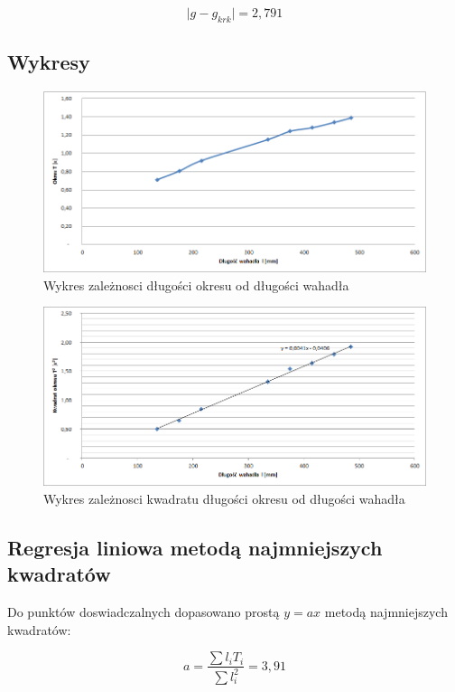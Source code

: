 \documentclass[a4paper,10pt,twoside]{article}
\begin{document}
$$\vert g - g_{krk} \vert = 2,791$$

\newpage

\subsection{Wykresy}

\begin{figure}[!htp]
\centerline{\includegraphics[scale=1]{wykres1.png}}
\caption{Wykres zależnosci długości okresu od długości wahadła}
\label{fig:tl}
\end{figure}

\begin{figure}[!htp]
\centerline{\includegraphics[scale=1]{wykres2.png}}
\caption{Wykres zależnosci kwadratu długości okresu od długości wahadła}
\label{fig:ttl}
\end{figure}

\subsection{Regresja liniowa metodą najmniejszych kwadratów}

Do punktów doswiadczalnych dopasowano prostą $y = a x$ metodą najmniejszych kwadratów:

$$ a = \frac{\sum l_i T_i}{\sum l_i^2} = 3,91 $$
\end{document}

